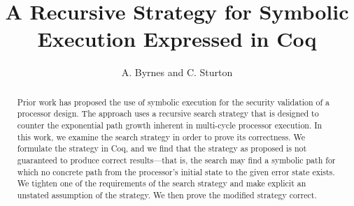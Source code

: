\documentclass[runningheads]{llncs}
\begin{document}
\title{A Recursive Strategy for Symbolic Execution Expressed in Coq}
\author{A. Byrnes and C. Sturton}




\maketitle

\begin{abstract}
Prior work has proposed the use of symbolic execution for the security
validation of a processor design. The approach uses a recursive search strategy
that is designed to counter the exponential path growth inherent in multi-cycle
processor execution. In this work, we examine the search strategy in order to prove its correctness. We formulate the
strategy in Coq, and we find that the
strategy as proposed is not guaranteed to produce correct results---that is, the
search may find a symbolic path for which no concrete path from the processor's initial state
to the given error state exists. We tighten one of the requirements of the
search strategy and make explicit an unstated assumption of the strategy. We then prove the modified strategy correct. 
\end{abstract}














\end{document}
